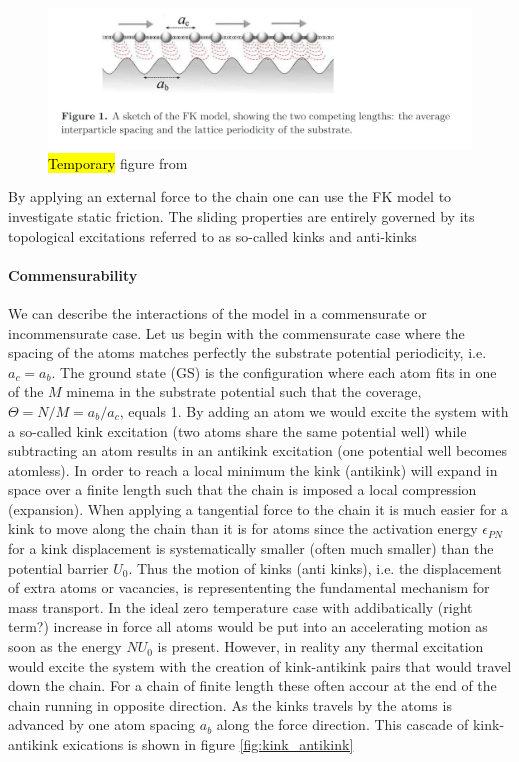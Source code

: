 
\begin{figure}[H]
  \centering
  \includegraphics[width=0.8\linewidth]{figures/theory/FK_model.png}
  \caption{\hl{Temporary} figure from \cite{Manini_2016}}
  \label{fig:FK_model}
\end{figure}

By applying an external force to the chain one can use the FK model to investigate static friction. The sliding properties are entirely governed by its topological excitations referred to as so-called kinks and anti-kinks

\paragraph*{Commensurability} We can describe the interactions of the model in a
commensurate or incommensurate case. Let us begin with the commensurate case
where the spacing of the atoms matches perfectly the substrate potential periodicity, i.e.
$a_c = a_b$. The ground state (GS) is the configuration where each atom fits in
one of the $M$ minema in the substrate potential such that the coverage, $\Theta
= N / M = a_b / a_c$, equals 1. By adding an atom we would excite the system
with a so-called kink excitation (two atoms share the same potential well) while subtracting an atom results in an
antikink excitation (one potential well becomes atomless). In order to reach a local minimum the kink (antikink)
will expand in space over a finite length such that the chain is imposed a local
compression (expansion). When applying a tangential force to the chain it is
much easier for a kink to move along the chain than it is for atoms since the
activation energy $\epsilon_{PN}$ for a kink displacement is systematically
smaller (often much smaller) than the potential barrier $U_0$. Thus the motion
of kinks (anti kinks), i.e. the displacement of extra atoms or vacancies, is represententing the fundamental mechanism for mass transport. In the ideal zero temperature case with addibatically (right term?) increase in force all atoms would be put into an accelerating motion as soon as the energy $NU_0$ is present. However, in reality any thermal excitation would excite the system with the creation of kink-antikink pairs that would travel down the chain. For a chain of finite length these often accour at the end of the chain running in opposite direction. As the kinks travels by the atoms is advanced by one atom spacing $a_b$ along the force direction. This cascade of kink-antikink exications is shown in figure \ref{fig:kink_antikink}


